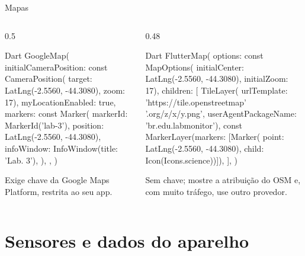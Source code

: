 \documentclass[aspectratio=169,10pt]{beamer}
\begin{document}
\begin{frame}[fragile]{Mapas}
  \begin{columns}[T]
    \begin{column}{0.5\textwidth}
\begin{codigo}[title=google\_maps\_flutter]{Dart}
GoogleMap(
  initialCameraPosition: const CameraPosition(
      target: LatLng(-2.5560, -44.3080), zoom: 17),
  myLocationEnabled: true,
  markers: {
    const Marker(
      markerId: MarkerId('lab-3'),
      position: LatLng(-2.5560, -44.3080),
      infoWindow: InfoWindow(title: 'Lab. 3'),
    ),
  },
)
\end{codigo}
      \begin{atencao}
        Exige chave da Google Maps Platform, restrita ao seu app.
      \end{atencao}
    \end{column}
    \begin{column}{0.48\textwidth}
\begin{codigo}[title=flutter\_map + OpenStreetMap]{Dart}
FlutterMap(
  options: const MapOptions(
      initialCenter: LatLng(-2.5560, -44.3080),
      initialZoom: 17),
  children: [
    TileLayer(
      urlTemplate: 'https://tile.openstreetmap'
          '.org/{z}/{x}/{y}.png',
      userAgentPackageName: 'br.edu.labmonitor'),
    const MarkerLayer(markers: [Marker(
      point: LatLng(-2.5560, -44.3080),
      child: Icon(Icons.science))]),
  ],
)
\end{codigo}
      \begin{dica}
        Sem chave; mostre a atribuição do OSM e, com muito tráfego, use outro provedor.
      \end{dica}
    \end{column}
  \end{columns}
\end{frame}

\section{Sensores e dados do aparelho}
\end{document}
